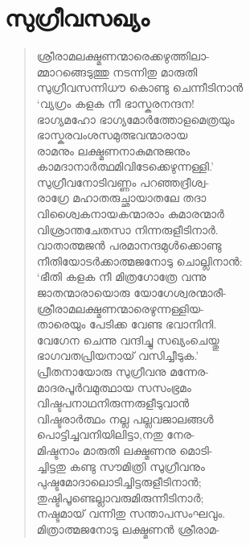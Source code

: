 
\section{സുഗ്രീവസഖ്യം}

\begin{verse}
ശ്രീരാമലക്ഷ്മണന്മാരെക്കഴുത്തിലാ-\\
മ്മാറങ്ങെടുത്തു നടന്നിതു മാരുതി\\
സുഗ്രീവസന്നിധൗ കൊണ്ടു ചെന്നീടിനാന്‍\\
‘വ്യഗ്രം കളക നീ ഭാസ്കരനന്ദന!\\
ഭാഗ്യമഹോ ഭാഗ്യമോര്‍ത്തോളമെത്രയും\\
ഭാസ്കരവംശസമുത്ഭവന്മാരായ\\
രാമനും ലക്ഷ്മണനാകുമനുജനും\\
കാമദാനാര്‍ത്ഥമിവിടേക്കെഴുന്നള്ളി.’\\
സുഗ്രീവനോടിവണ്ണം പറഞ്ഞദ്രീശ്വ-\\
രാഗ്രേ മഹാതരുച്ഛായാതലേ തദാ\\
വിശ്വൈകനായകന്മാരാം കുമാരന്മാര്‍\\
വിശ്രാന്തചേതസാ നിന്നരുളീടിനാര്‍.\\
വാതാത്മജന്‍ പരമാനന്ദമുള്‍ക്കൊണ്ടു\\
നീതിയോടര്‍ക്കാത്മജനോടു ചൊല്ലിനാന്‍:\\
‘ഭീതി കളക നീ മിത്രഗോത്രേ വന്നു\\
ജാതന്മാരായൊരു യോഗേശ്വരന്മാരീ-\\
ശ്രീരാമലക്ഷ്മണന്മാരെഴുന്നള്ളിയ-\\
താരെയും പേടിക്ക വേണ്ട ഭവാനിനി.\\
വേഗേന ചെന്നു വന്ദിച്ചു സഖ്യംചെയ്തു\\
ഭാഗവതപ്രിയനായ് വസിച്ചീടുക.’\\
പ്രീതനായോരു സുഗ്രീവനു മന്നേര-\\
മാദരപൂര്‍വമുത്ഥായ സസംഭ്രമം\\
വിഷ്ടപനാഥനിരുന്നരുളീടുവാന്‍\\
വിഷ്ടരാര്‍ത്ഥം നല്ല പല്ലവജാലങ്ങള്‍\\
പൊട്ടിച്ചവനിയിലിട്ടാ,നതു നേര-\\
മിഷ്ടനാം മാരുതി ലക്ഷ്മണനു മൊടി-\\
ച്ചിട്ടതു കണ്ടു സൗമിത്രി സുഗ്രീവനും\\
പുഷ്ടമോദാലൊടിച്ചിട്ടരുളീടിനാന്‍;\\
തുഷ്ടിപൂണ്ടെല്ലാവരുമിരുന്നീടിനാര്‍;\\
നഷ്ടമായ് വന്നിതു സന്താപസംഘവും.\\
മിത്രാത്മജനോടു ലക്ഷ്മണന്‍ ശ്രീരാമ-\\

\end{verse}
